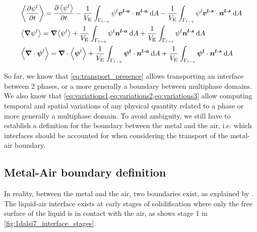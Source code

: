 \begin{align}
\label{eq:variations1}
& \left \langle {\ensuremath{\frac{\partial \psi^l}{\partial t} }} \right \rangle = \frac{\partial \left \langle \psi^l \right \rangle}{\partial t} 
							- \frac{1}{V_\text{E}} \int_{\Gamma_{l-a}} \psi^l \boldsymbol{v^{l\text{-}a}} \cdot \boldsymbol{n^{l\text{-}a}}\: \mathrm{d}A
							- \frac{1}{V_\text{E}} \int_{\Gamma_{l-s}} \psi^l \boldsymbol{v^{l\text{-}s}} \cdot \boldsymbol{n^{l\text{-}s}}\: \mathrm{d}A \\
\label{eq:variations2}
& \left \langle \boldsymbol{\nabla} \psi^l \right \rangle =  \boldsymbol{\nabla}{\left \langle \psi^l \right \rangle} 
							+ \frac{1}{V_\text{E}} \int_{\Gamma_{l-a}} \psi^l \boldsymbol{n^{l\text{-}a}}\: \mathrm{d}A 
							+\frac{1}{V_\text{E}} \int_{\Gamma_{l-s}} \psi^l \boldsymbol{n^{l\text{-}s}} \: \mathrm{d}A \\
\label{eq:variations3}
& \left \langle \boldsymbol{\nabla} \cdot \boldsymbol{\psi}^l \right \rangle =  \boldsymbol{\nabla} \cdot {\ensuremath{\left \langle \boldsymbol{\psi}^l \right \rangle}} 
							+ \frac{1}{V_\text{E}} \int_{\Gamma_{l-a}} \boldsymbol{\psi^l} \cdot \boldsymbol{n^{l\text{-}a}} \: \mathrm{d}A 
							+\frac{1}{V_\text{E}} \int_{\Gamma_{l-s}} \boldsymbol{\psi^l} \cdot  \boldsymbol{n^{l\text{-}s}} \: \mathrm{d}A							
\end{align}

So far, we know that \cref{eq:transport_presence} allows transporting an interface between 2 phases, 
or a more generally a boundary between multiphase domains.
We also know that \cref{eq:variations1,eq:variations2,eq:variations3} allow computing temporal and spatial
variations of any physical quantity related to a phase or more generally a multiphase domain.
To avoid ambiguity, we still have to establish a definition for the boundary between the metal and the air, i.e. which 
interfaces should be accounted for when considering the transport of the metal-air boundary.



\subsection{Metal-Air boundary definition} 

In reality, between the metal and the air, two boundaries exist, as explained by \citet{niane_etude_2004}. 
The liquid-air interface exists at early stages of solidification where only the free surface of the liquid is in contact with the air, as shows stage 1 in  \cref{fig:1dalsi7_interface_stages}.

